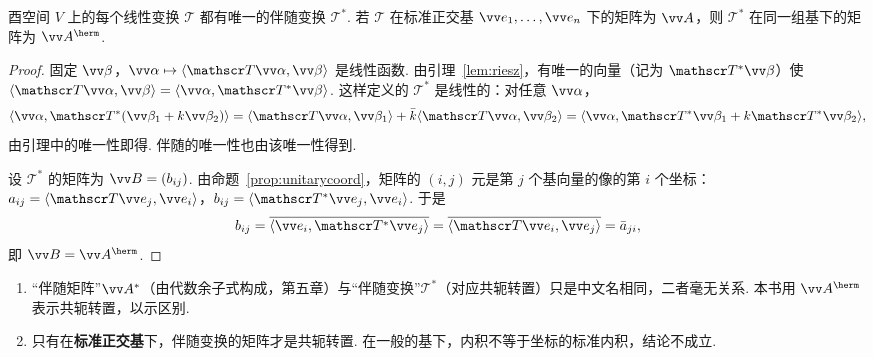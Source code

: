 	\begin{theorem}\label{thm:adjoint}
		酉空间 $V$ 上的每个线性变换 $\mathscr T$ 都有唯一的伴随变换 $\mathscr T^*$. 若 $\mathscr T$ 在标准正交基 $\vv e_1,\ldots,\vv e_n$ 下的矩阵为 $\vv A$，则 $\mathscr T^*$ 在同一组基下的矩阵为 $\vv A^\herm$.
	\end{theorem}
	\begin{proof}
		固定 $\vv\beta$，$\vv\alpha\mapsto\langle\mathscr T\vv\alpha,\vv\beta\rangle$ 是线性函数. 由引理~\ref{lem:riesz}，有唯一的向量（记为 $\mathscr T^*\vv\beta$）使 $\langle\mathscr T\vv\alpha,\vv\beta\rangle=\langle\vv\alpha,\mathscr T^*\vv\beta\rangle$. 这样定义的 $\mathscr T^*$ 是线性的：对任意 $\vv\alpha$，
		\[\langle\vv\alpha,\mathscr T^*(\vv\beta_1+k\vv\beta_2)\rangle=\langle\mathscr T\vv\alpha,\vv\beta_1\rangle+\bar k\langle\mathscr T\vv\alpha,\vv\beta_2\rangle=\langle\vv\alpha,\mathscr T^*\vv\beta_1+k\mathscr T^*\vv\beta_2\rangle,\]
		由引理中的唯一性即得. 伴随的唯一性也由该唯一性得到.
		
		设 $\mathscr T^*$ 的矩阵为 $\vv B=(b_{ij})$. 由命题~\ref{prop:unitarycoord}，矩阵的 $(i,j)$ 元是第 $j$ 个基向量的像的第 $i$ 个坐标：$a_{ij}=\langle\mathscr T\vv e_j,\vv e_i\rangle$，$b_{ij}=\langle\mathscr T^*\vv e_j,\vv e_i\rangle$. 于是
		\[b_{ij}=\overline{\langle\vv e_i,\mathscr T^*\vv e_j\rangle}=\overline{\langle\mathscr T\vv e_i,\vv e_j\rangle}=\bar a_{ji},\]
		即 $\vv B=\vv A^\herm$.
	\end{proof}
	
	\begin{pitfallbox}
		\begin{enumerate}
			\item “伴随矩阵”$\vv A^*$（由代数余子式构成，第五章）与“伴随变换”$\mathscr T^*$（对应共轭转置）只是中文名相同，二者毫无关系. 本书用 $\vv A^\herm$ 表示共轭转置，以示区别.
			\item 只有在\textbf{标准正交基}下，伴随变换的矩阵才是共轭转置. 在一般的基下，内积不等于坐标的标准内积，结论不成立.
		\end{enumerate}
	\end{pitfallbox}
	
